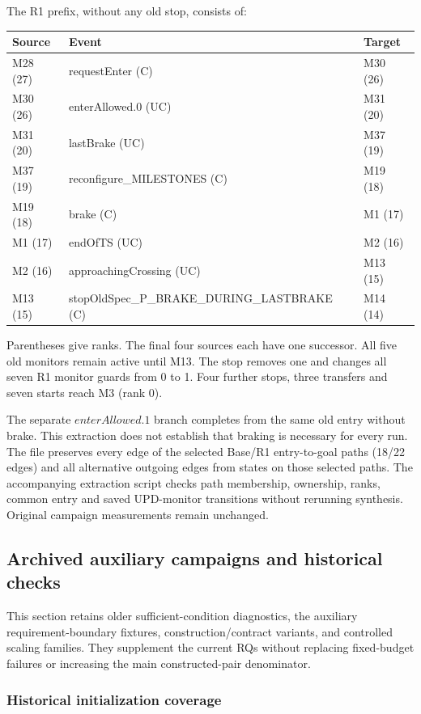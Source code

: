\documentclass[11pt]{article}
\begin{document}
The R1 prefix, without any old stop, consists of:
\begin{center}\small
\begin{tabular}{lll}
Source & Event & Target\\\hline
M28 (27) & requestEnter (C) & M30 (26)\\
M30 (26) & enterAllowed.0 (UC) & M31 (20)\\
M31 (20) & lastBrake (UC) & M37 (19)\\
M37 (19) & reconfigure\_MILESTONES (C) & M19 (18)\\
M19 (18) & brake (C) & M1 (17)\\
M1 (17) & endOfTS (UC) & M2 (16)\\
M2 (16) & approachingCrossing (UC) & M13 (15)\\
M13 (15) & stopOldSpec\_P\_BRAKE\_DURING\_LASTBRAKE (C) & M14 (14)
\end{tabular}
\end{center}
Parentheses give ranks. The final four sources each have one successor. All five old monitors remain active until M13. The stop removes one and changes all seven R1 monitor guards from 0 to 1. Four further stops, three transfers and seven starts reach M3 (rank 0).

The separate $enterAllowed.1$ branch completes from the same old entry without brake. This extraction does not establish that braking is necessary for every run. The file  preserves every edge of the selected Base/R1 entry-to-goal paths (18/22 edges) and all alternative outgoing edges from states on those selected paths. The accompanying extraction script checks path membership, ownership, ranks, common entry and saved UPD-monitor transitions without rerunning synthesis. Original campaign measurements remain unchanged.

\clearpage
\subsection{Archived auxiliary campaigns and historical checks}
\label{supp:auxiliary-campaigns}
This section retains older sufficient-condition diagnostics, the auxiliary requirement-boundary fixtures, construction/contract variants, and controlled scaling families. They supplement the current RQs without replacing fixed-budget failures or increasing the main constructed-pair denominator.

\subsubsection{Historical initialization coverage}\label{supp:historical-init}
\end{document}
